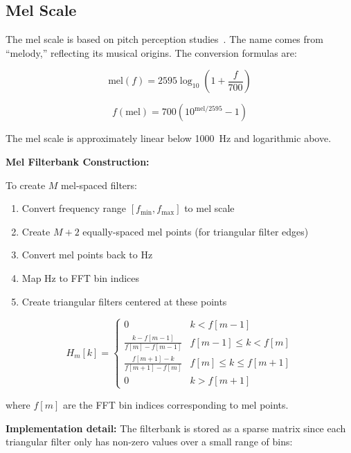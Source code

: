 \subsection{Mel Scale}\label{subsec:mel_scale}

The mel scale is based on pitch perception
studies~\cite{stevens1937scale}. The name comes from ``melody,''
reflecting its musical origins. The conversion formulas are:

\begin{equation}
  \label{eq:hz_to_mel}
  \text{mel}(f) = 2595 \log_{10}\left(1 + \frac{f}{700}\right)
\end{equation}

\begin{equation}
  \label{eq:mel_to_hz}
  f(\text{mel}) = 700\left(10^{\text{mel}/2595} - 1\right)
\end{equation}

The mel scale is approximately linear below 1000~Hz and logarithmic above.

\textbf{Mel Filterbank Construction:}

To create $M$ mel-spaced filters:

\begin{enumerate}
  \item Convert frequency range $[f_{\min}, f_{\max}]$ to mel scale
  \item Create $M + 2$ equally-spaced mel points (for triangular filter edges)
  \item Convert mel points back to Hz
  \item Map Hz to FFT bin indices
  \item Create triangular filters centered at these points
\end{enumerate}

\begin{equation}
  H_m[k] =
  \begin{cases}
    0 & k < f[m-1] \\
    \frac{k - f[m-1]}{f[m] - f[m-1]} & f[m-1] \leq k < f[m] \\
    \frac{f[m+1] - k}{f[m+1] - f[m]} & f[m] \leq k \leq f[m+1] \\
    0 & k > f[m+1]
  \end{cases}
\end{equation}

where $f[m]$ are the FFT bin indices corresponding to mel points.

\textbf{Implementation detail:} The filterbank is stored as a sparse
matrix since each triangular filter only has non-zero values over a
small range of bins:

